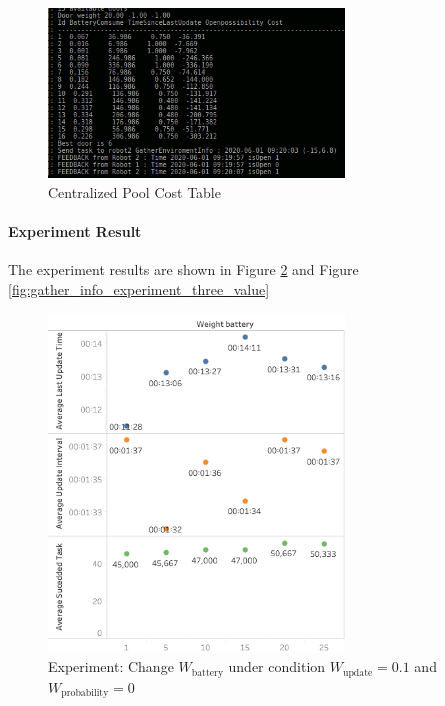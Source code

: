 \begin{figure}[htbp]
 \centering
 \includegraphics[width = 0.7\textwidth]{content/images/ch5/weight_analyze.png}
 \caption{Centralized Pool Cost Table}
 \label{fig:cost_table}
\end{figure}

\paragraph{Experiment Result} The experiment results are shown in Figure \ref{fig:gather_info_experiment_two_value} and Figure \ref{fig:gather_info_experiment_three_value}
\begin{figure}[htbp]
 \centering
 \includegraphics[width = 0.7\textwidth]{content/images/ch5/gather_info_change_weight_battery_only.png}
 \caption{Experiment: Change $W_{\mbox{battery}}$ under condition $W_{\mbox{update}} = 0.1$ and $W_{\mbox{probability}}=0$}
 \label{fig:gather_info_experiment_two_value}
\end{figure}

